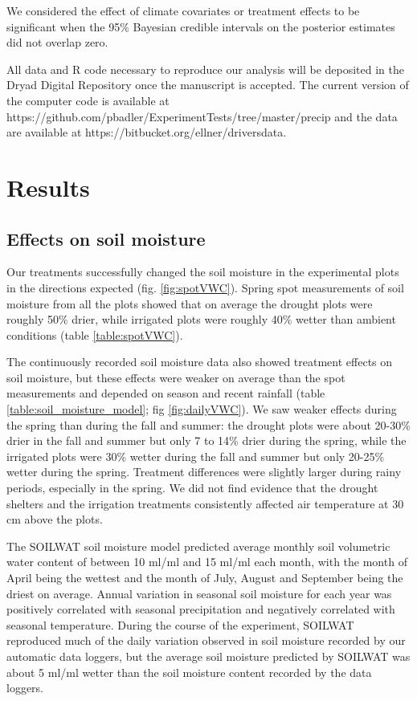 \documentclass[11pt]{article}
\begin{document}
\begin{doublespacing}
We considered the effect of climate covariates or treatment effects to be significant when the 95\% Bayesian credible intervals on the posterior estimates did not overlap zero.  

All data and R code necessary to reproduce our analysis will be deposited in the Dryad Digital Repository once the manuscript is accepted. The current version of the computer code is available at https://github.com/pbadler/ExperimentTests/tree/master/precip and the data are available at https://bitbucket.org/ellner/driversdata. 

\section*{Results}

\subsection*{Effects on soil moisture}

Our treatments successfully changed the soil moisture in the experimental plots in the directions expected (fig. \ref{fig:spotVWC}). Spring spot measurements of soil moisture from all the plots showed that on average the drought plots were roughly 50\% drier, while irrigated plots were roughly 40\% wetter than ambient conditions (table \ref{table:spotVWC}).
  
The continuously recorded soil moisture data also showed treatment effects on soil moisture, but these effects were weaker on average than the spot measurements and depended on season and recent rainfall (table \ref{table:soil_moisture_model}; fig \ref{fig:dailyVWC}). We saw weaker effects during the spring than during the fall and summer: the drought plots were about 20-30\% drier in the fall and summer but only 7 to 14\% drier during the spring, while the irrigated plots were 30\% wetter during the fall and summer but only 20-25\% wetter during the spring.  Treatment differences were slightly larger during rainy periods, especially in the spring. We did not find evidence that the drought shelters and the irrigation treatments consistently affected air temperature at 30 cm above the plots.  

The SOILWAT soil moisture model predicted average monthly soil volumetric water content of between 10 ml/ml and 15 ml/ml each month, with the month of April being the wettest and the month of July, August and September being the driest on average. Annual variation in seasonal soil moisture for each year was positively correlated with seasonal precipitation and negatively correlated with seasonal temperature. During the course of the experiment, SOILWAT reproduced much of the daily variation observed in soil moisture recorded by our automatic data loggers, but the average soil moisture predicted by SOILWAT was about 5 ml/ml wetter than the soil moisture content recorded by the data loggers.  


\end{doublespacing}
\end{document}
